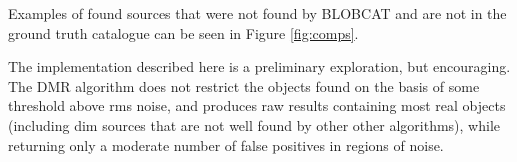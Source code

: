 \documentclass[
    ,final            %
  ]
  {aipproc}
\begin{document}
% 
Examples of found sources that were not found by BLOBCAT and are not in the ground truth catalogue can be seen in Figure \ref{fig:comps}.


The implementation described here is a preliminary exploration, but encouraging. The DMR algorithm does not restrict the objects found on the basis of some threshold above rms noise, and produces raw results containing most real objects (including dim sources that are not well found by other other algorithms), while returning only a moderate number of false positives in regions of noise.

\end{document}
